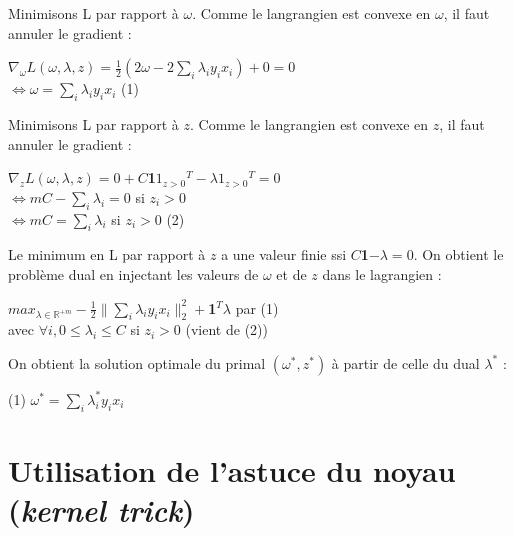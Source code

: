 \documentclass{article}
\begin{document}
Minimisons L par rapport à $\omega$. Comme le langrangien est convexe en $\omega$, il faut annuler le gradient :\\

              \begin{center}
              $\nabla_{\omega} L(\omega, \lambda, z) = \frac{1}{2}(2\omega - 2\sum_i \lambda_iy_ix_i) + 0 = 0$\\
              $\Leftrightarrow \omega = \sum_i \lambda_iy_ix_i$ (1)\\
              \end{center}

Minimisons L par rapport à $z$. Comme le langrangien est convexe en $z$, il faut annuler le gradient :\\

              \begin{center}
              $\nabla_{z} L(\omega, \lambda, z) = 0 + C$\textbf{1}\textbf{$1_{z>0}$}$^T - \lambda$\textbf{$1_{z>0}$}$^T = 0$\\
              $\Leftrightarrow mC - \sum_i \lambda_i = 0$ si $z_i > 0$\\
              $\Leftrightarrow mC = \sum_i \lambda_i$ si $z_i > 0$ (2)\\
              \end{center}

Le minimum en L par rapport à $z$ a une valeur finie ssi $C$\textbf{1}$ - \lambda = 0$. On obtient le problème dual en injectant les valeurs de $\omega$ et de $z$ dans le lagrangien :\\

             \begin{center}
             $max_{\lambda \in \mathbb{R}^{+m}} -\frac{1}{2}\|\sum_i\lambda_iy_ix_i\|^2_2 + $\textbf{1}$^T\lambda$ par (1)\\ 
             avec $\forall i, 0 \leq \lambda_i \leq C$ si $z_i > 0$ (vient de (2))\\
             \end{center}

On obtient la solution optimale du primal $(\omega^*, z^*)$ à partir de celle du dual $\lambda^*$ :

             \begin{center}
             (1) $\omega^{*} = \sum_i \lambda^{*}_i y_i x_i$
             \end{center}

\section{Utilisation de l'astuce du noyau (\emph{kernel trick})}
\end{document}
